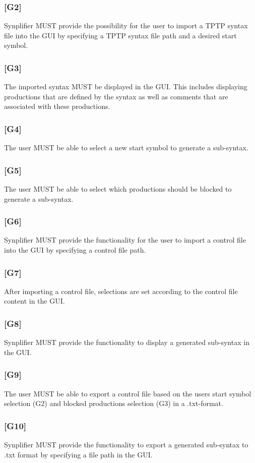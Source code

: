 \subsubsection{[G2]}\label{G2}
\ac{Synplifier} MUST provide the possibility for the user to import a \ac{TPTP} syntax file into the GUI by specifying a \ac{TPTP} syntax file path and a desired start symbol. 
\subsubsection{[G3]}\label{G3}
The imported syntax MUST be displayed in the GUI. This includes displaying productions that are defined by the syntax as well as comments that are associated with these productions.
\subsubsection{[G4]}\label{G4}
The user MUST be able to select a new start symbol to generate a sub-syntax.
\subsubsection{[G5]}\label{G5}
The user MUST be able to select which productions should be blocked to generate a sub-syntax.
\subsubsection{[G6]}\label{G9}
\ac{Synplifier} MUST provide the functionality for the user to import a control file into the GUI by specifying a control file path. 
\subsubsection{[G7]}\label{G7}
After importing a control file, selections are set according to the control file content in the GUI.
\subsubsection{[G8]}\label{G8}
\ac{Synplifier} MUST provide the functionality to display a generated sub-syntax in the GUI.
\subsubsection{[G9]}\label{G9}
The user MUST be able to export a control file based on the users start symbol selection (G2) and blocked productions selection (G3) in a .txt-format.
\subsubsection{[G10]}\label{G10}
\ac{Synplifier} MUST provide the functionality to export a generated sub-syntax to .txt format by specifying a file path in the GUI.
